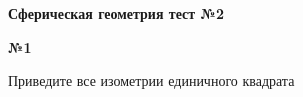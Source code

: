 


    \begin{center}
        \textbf{Сферическая геометрия тест №2}\\
    \end{center}

    \begin{center}
        \textbf{№1}
    \end{center}

    Приведите все изометрии единичного квадрата



